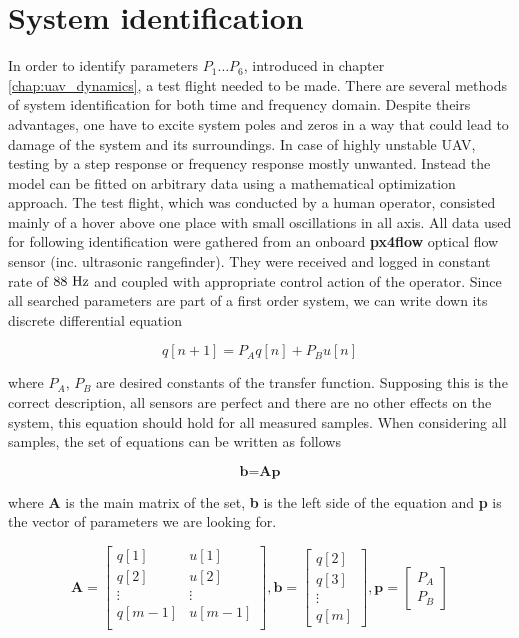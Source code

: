 \section{System identification}
\label{cap:system_identification}

In order to identify parameters $P_1 \hdots P_6$, introduced in chapter \ref{chap:uav_dynamics}, a test flight needed to be made. There are several methods of system identification for both time and frequency domain. Despite theirs advantages, one have to excite system poles and zeros in a way that could lead to damage of the system and its surroundings. In case of highly unstable UAV, testing by a step response or frequency response mostly unwanted. Instead the model can be fitted on arbitrary data using a mathematical optimization approach. The test flight, which was conducted by a human operator, consisted mainly of a hover above one place with small oscillations in all axis. All data used for following identification were gathered from an onboard \textbf{px4flow} optical flow sensor (inc. ultrasonic rangefinder). They were received and logged in constant rate of $88~\mathrm{Hz}$ and coupled with appropriate control action of the operator. Since all searched parameters are part of a first order system, we can write down its discrete differential equation

\begin{equation}
q[n+1] = P_Aq[n] + P_Bu[n]
\end{equation}

where $P_A$, $P_B$ are desired constants of the transfer function. Supposing this is the correct description, all sensors are perfect and there are no other effects on the system, this equation should hold for all measured samples. When considering all samples, the set of equations can be written as follows

\begin{equation}
\textbf{b} = \textbf{A}\textbf{p}
\label{eq:bap}
\end{equation}

where \textbf{A} is the main matrix of the set, \textbf{b} is the left side of the equation and \textbf{p} is the vector of parameters we are looking for.

\begin{equation}
\textbf{A} = \begin{bmatrix}
q[1] & u[1] \\
q[2] & u[2] \\
\vdots & \vdots \\
q[m-1] & u[m-1] \\
\end{bmatrix},
\textbf{b} = \begin{bmatrix}
q[2] \\
q[3] \\
\vdots\\
q[m]
\end{bmatrix},
\textbf{p} = \begin{bmatrix}
P_A \\
P_B
\end{bmatrix}
\end{equation}

